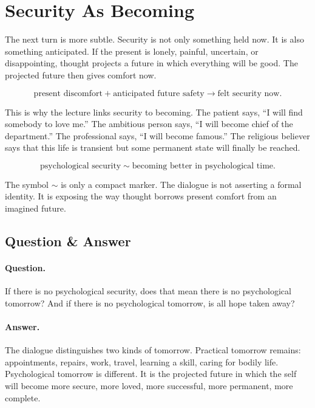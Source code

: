 \documentclass[11pt,oneside]{book}
\begin{document}
\section{Security As Becoming}

The next turn is more subtle. Security is not only something held now. It is also something anticipated. If the present is lonely, painful, uncertain, or disappointing, thought projects a future in which everything will be good. The projected future then gives comfort now.

\begin{equation}
\text{present discomfort}
+
\text{anticipated future safety}
\longrightarrow
\text{felt security now}.
\end{equation}

This is why the lecture links security to becoming. The patient says, ``I will find somebody to love me.'' The ambitious person says, ``I will become chief of the department.'' The professional says, ``I will become famous.'' The religious believer says that this life is transient but some permanent state will finally be reached.

\begin{equation}
\text{psychological security}
\sim
\text{becoming better in psychological time}.
\end{equation}

The symbol \(\sim\) is only a compact marker. The dialogue is not asserting a formal identity. It is exposing the way thought borrows present comfort from an imagined future.

\subsection{Question \& Answer}

\paragraph{Question.}
If there is no psychological security, does that mean there is no psychological tomorrow? And if there is no psychological tomorrow, is all hope taken away?

\paragraph{Answer.}
The dialogue distinguishes two kinds of tomorrow. Practical tomorrow remains: appointments, repairs, work, travel, learning a skill, caring for bodily life. Psychological tomorrow is different. It is the projected future in which the self will become more secure, more loved, more successful, more permanent, more complete.
\end{document}
